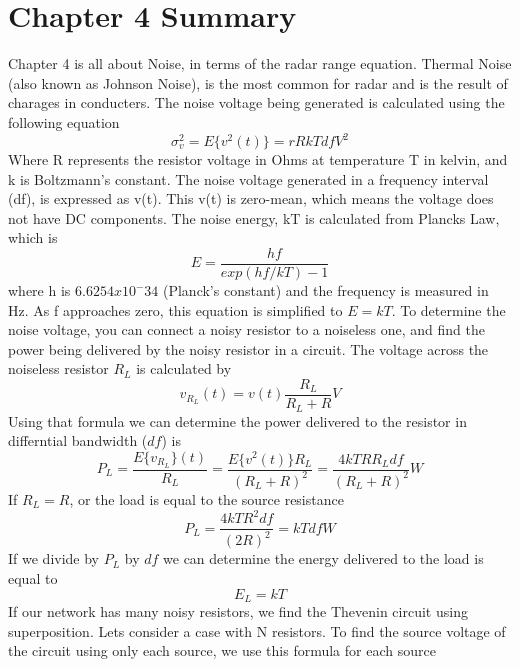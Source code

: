 \documentclass[12pt]{article}
\begin{document}
\section{Chapter 4 Summary}
Chapter 4 is all about Noise, in terms of the radar range equation. Thermal Noise (also known as Johnson Noise), is the most common for radar and is the result of charages in conducters. The noise voltage being generated is calculated using the following equation 
\begin{equation}
    \sigma_v^2 = E \{ v^2 (t) \} = r R k T df V^2
\end{equation}
Where R represents the resistor voltage in Ohms at temperature T in kelvin, and k is Boltzmann's constant. The noise voltage generated in a frequency interval (df), is expressed as v(t). This v(t) is zero-mean, which means the voltage does not have DC components. The noise energy, kT is calculated from Plancks Law, which is 
\begin{equation}
    E = \frac{hf}{ exp(hf/ kT) - 1}
\end{equation} 
where h is $6.6254x10^-34$ (Planck's constant) and the frequency is measured in Hz. As f approaches zero, this equation is simplified to $E =kT$. To determine the noise voltage, you can connect a noisy resistor to a noiseless one, and find the power being delivered by the noisy resistor in a circuit. The voltage across the noiseless resistor $R_L$ is calculated by
\begin{equation}
    v_{R_L} (t) = v (t) \frac{R_L}{R_L + R} V
\end{equation} 
Using that formula we can determine the power delivered to the resistor in differntial bandwidth ($df$) is
\begin{equation}
    P_L = \frac{ E \{v_{R_L} \}(t)}{R_L} = \frac{E \{ v^2 (t)\} R_L}{(R_L + R)^2} = \frac{4kTRR_L df}{(R_L + R)^2} W
\end{equation}
If $R_L = R$, or the load is equal to the source resistance
\begin{equation}
    P_L = \frac{4kTR^2 df}{(2R)^2} = kTdf W
\end{equation}
If we divide by $P_L$ by $df$ we can determine the energy delivered to the load is equal to 
\begin{equation}
    E_L = kT
\end{equation}
If our network has many noisy resistors, we find the Thevenin circuit using superposition. Lets consider a case with N resistors. To find the source voltage of the circuit using only each source, we use this formula for each source
\end{document}
